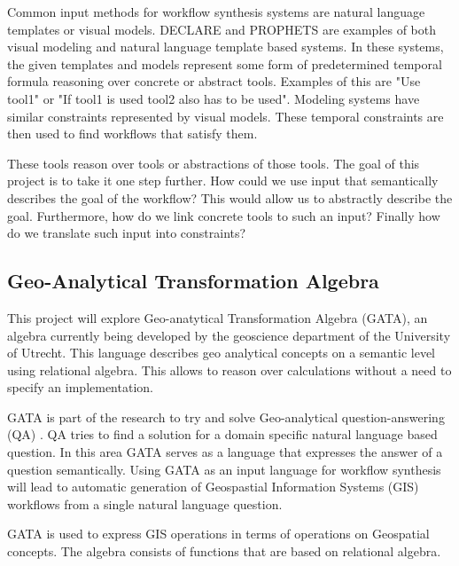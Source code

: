 \documentclass{article}
\begin{document}
Common input methods for workflow synthesis systems are natural language templates or visual models. DECLARE \cite{pesic2007declare} and PROPHETS \cite{Prophets} are examples of both visual modeling and natural language template based systems. In these systems, the given templates and models represent some form of predetermined temporal formula reasoning over concrete or abstract tools. Examples of this are "Use tool1" or "If tool1 is used tool2 also has to be used". Modeling systems have similar constraints represented by visual models. These temporal constraints are then used to find workflows that satisfy them.


These tools reason over tools or abstractions of those tools. The goal of this project is to take it one step further. 
How could we use input that semantically describes the goal of the workflow? This would allow us to abstractly describe the goal. Furthermore, how do we link concrete tools to such an input? Finally how do we translate such input into constraints? 


\subsection{Geo-Analytical Transformation Algebra}
This project will explore Geo-anatytical Transformation Algebra (GATA), an algebra currently being developed by the geoscience department of the University of Utrecht.
This language describes geo analytical concepts on a semantic level using relational algebra. This allows to reason over calculations without a need to specify an implementation. 

GATA is part of the research to try and solve Geo-analytical question-answering (QA) \cite{scheider2020geo}. QA tries to find a solution for a domain specific natural language based question. In this area GATA serves as a language that expresses the answer of a question semantically. Using GATA as an input language for workflow synthesis will lead to automatic generation of Geospastial Information Systems (GIS) workflows from a single natural language question.

GATA is used to express GIS operations in terms of operations on Geospatial concepts. The algebra consists of functions that are based on relational algebra.  


\end{document}
